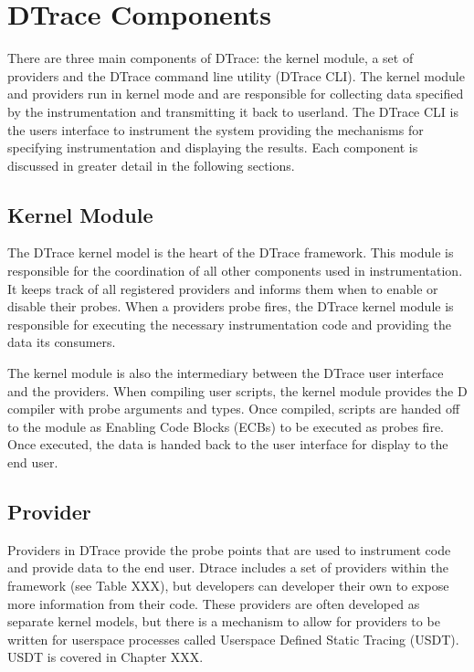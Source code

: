 \section{DTrace Components}

There are three main components of DTrace: the kernel module, a set of
providers and the DTrace command line utility (DTrace CLI). The kernel
module and providers run in kernel mode and are responsible for
collecting data specified by the instrumentation and transmitting it
back to userland. The DTrace CLI is the users interface to instrument
the system providing the mechanisms for specifying instrumentation and
displaying the results. Each component is discussed in greater detail
in the following sections.

\subsection{Kernel Module}

The DTrace kernel model is the heart of the DTrace framework. This
module is responsible for the coordination of all other components
used in instrumentation. It keeps track of all registered providers
and informs them when to enable or disable their probes. When a
providers probe fires, the DTrace kernel module is responsible for
executing the necessary instrumentation code and providing the data
its consumers.

The kernel module is also the intermediary between the DTrace user
interface and the providers. When compiling user scripts, the kernel
module provides the D compiler with probe arguments and types. Once
compiled, scripts are handed off to the module as Enabling Code Blocks
(ECBs) to be executed as probes fire. Once executed, the data is
handed back to the user interface for display to the end user.

\subsection{Provider}

Providers in DTrace provide the probe points that are used to
instrument code and provide data to the end user. Dtrace includes a
set of providers within the framework (see Table XXX), but developers
can developer their own to expose more information from their
code. These providers are often developed as separate kernel models,
but there is a mechanism to allow for providers to be written for
userspace processes called Userspace Defined Static Tracing
(USDT). USDT is covered in Chapter XXX.

